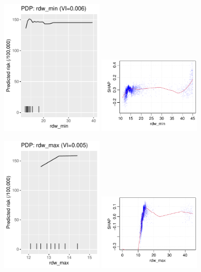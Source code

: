 \documentclass[12pt]{article}
\begin{document}
\begin{figure}[h]
\centering
\includegraphics[width=0.45\textwidth]{figures/pdp/rdw_min.pdf}
\includegraphics[width=0.45\textwidth]{figures/shap/rdw_min.pdf}
\end{figure}
\begin{figure}[h]
\centering
\includegraphics[width=0.45\textwidth]{figures/pdp/rdw_max.pdf}
\includegraphics[width=0.45\textwidth]{figures/shap/rdw_max.pdf}
\end{figure}
\end{document}
